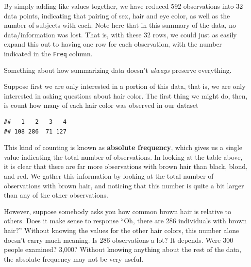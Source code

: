 \documentclass[
]{book}
\newenvironment{Shaded}{\begin{snugshade}}{\end{snugshade}}
\newcommand{\CommentTok}[1]{\textcolor[rgb]{0.56,0.35,0.01}{\textit{#1}}}
\newcommand{\FunctionTok}[1]{\textcolor[rgb]{0.00,0.00,0.00}{#1}}
\newcommand{\NormalTok}[1]{#1}
\newcommand{\OtherTok}[1]{\textcolor[rgb]{0.56,0.35,0.01}{#1}}
\newcommand{\SpecialCharTok}[1]{\textcolor[rgb]{0.00,0.00,0.00}{#1}}
\theoremstyle{definition}
\theoremstyle{definition}
\theoremstyle{definition}
\theoremstyle{remark}
\begin{document}
By simply adding like values together, we have reduced 592 observations into 32 data points, indicating that pairing of sex, hair and eye color, as well as the number of subjects with each. Note here that in this summary of the data, no data/information was lost. That is, with these 32 rows, we could just as easily expand this out to having one row for each observation, with the number indicated in the \texttt{Freq} column.

Something about how summarizing data doesn't \emph{always} preserve everything.

Suppose first we are only interested in a portion of this data, that is, we are only interested in asking questions about hair color. The first thing we might do, then, is count how many of each hair color was observed in our dataset

\begin{Shaded}
\end{Shaded}

\begin{verbatim}
##   1   2   3   4 
## 108 286  71 127
\end{verbatim}

This kind of counting is known as \textbf{absolute frequency}, which gives us a single value indicating the total number of observations. In looking at the table above, it is clear that there are far more observations with brown hair than black, blond, and red. We gather this information by looking at the total number of observations with brown hair, and noticing that this number is quite a bit larger than any of the other observations.

However, suppose somebody asks you how common brown hair is relative to others. Does it make sense to response ``Oh, there are 286 individuals with brown hair?'' Without knowing the values for the other hair colors, this number alone doesn't carry much meaning. Is 286 observations a lot? It depends. Were 300 people examined? 3,000? Without knowing anything about the rest of the data, the absolute frequency may not be very useful.
\end{document}
